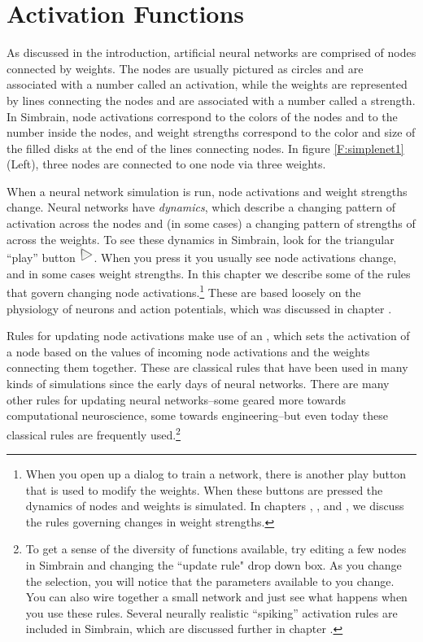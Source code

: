 \chapter{Activation Functions}\label{ch_act_functions}


 As discussed in the introduction, artificial neural networks are comprised of nodes connected by weights. The nodes are usually pictured as circles and are associated with a number called an activation, while the weights are represented by lines connecting the nodes and are associated with a number called a strength. In Simbrain, node activations correspond to the colors of the nodes and to the number inside the nodes, and weight strengths correspond to the color and size of the filled disks at the end of the lines connecting nodes. In figure \ref{F:simplenet1} (Left), three nodes are connected to one node via three weights. 

When a neural network simulation is run, node activations and weight strengths change. Neural networks have \emph{dynamics}, which describe a changing pattern of activation across the nodes and (in some cases) a changing pattern of strengths of across the weights. To see these dynamics in Simbrain, look for the triangular ``play''  button \includegraphics[scale=.5]{./images/Play.png}. When you press it you usually see node activations change, and in some cases weight strengths. In this chapter we describe some of the rules that govern changing node activations.\footnote{When you open up a dialog to train a network, there is another play button that is used to modify the weights. When these buttons are pressed the dynamics of nodes and weights is simulated. In chapters , , and , we discuss the rules governing changes in weight strengths.} These are based loosely on the physiology of neurons and action potentials, which was discussed in chapter . 

Rules for updating node activations make use of an , which sets the activation of a node based on the values of incoming node activations and the weights connecting them together. These are classical rules that have been used in many kinds of simulations since the early days of neural networks. There are many other rules for updating neural networks--some geared more towards computational neuroscience, some towards engineering--but even today these classical rules are frequently used.\footnote{To get a sense of the diversity of functions available, try editing a few nodes in Simbrain and changing the 
``update rule" drop down box. As you change the selection, you will notice that 
the parameters available to you change. You can also wire together a small 
network and just see what happens when you use these rules. Several neurally realistic ``spiking'' activation rules are included in Simbrain, which are discussed further in chapter .}

